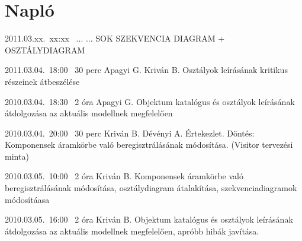 %
\section{Napló}

\begin{naplo}

\bejegyzes
{2011.03.xx.~xx:xx~} %
{...} %
{...} %
{SOK SZEKVENCIA DIAGRAM + OSZTÁLYDIAGRAM} %

\bejegyzes
{2011.03.04.~18:00~} %
{30 perc} %
{Apagyi G.\newline
Kriván B.} %
{Osztályok leírásának kritikus részeinek átbeszélése} %

\bejegyzes
{2010.03.04.~18:30~}
{2 óra}
{Apagyi G.}
{Objektum katalógus és osztályok leírásának átdolgozása az aktuális modellnek megfelelően}

\bejegyzes
{2010.03.04.~20:00~}
{30 perc}
{Kriván B.\newline
Dévényi A.}
{Értekezlet.\newline
Döntés: Komponensek áramkörbe való beregisztrálásának módosítása. (Visitor tervezési minta)}

\bejegyzes
{2010.03.05.~10:00~}
{2 óra}
{Kriván B.}
{Komponensek áramkörbe való beregisztrálásának módosítása, osztálydiagram átalakítása, szekvenciadiagramok módosítáasa}

\bejegyzes
{2010.03.05.~16:00~}
{2 óra}
{Kriván B.}
{Objektum katalógus és osztályok leírásának átdolgozása az aktuális modellnek megfelelően, apróbb hibák javítása.}


\end{naplo}


